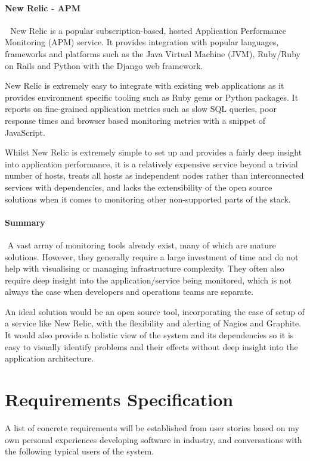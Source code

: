 \documentclass{cshonours}
\begin{document}
\subsubsection{New Relic - APM} 
New Relic is a popular subscription-based, hosted Application Performance Monitoring (APM) service. It provides integration with popular languages, frameworks and platforms such as the Java Virtual Machine (JVM), Ruby/Ruby on Rails and Python with the Django web framework.

New Relic is extremely easy to integrate with existing web applications as it provides environment specific tooling such as Ruby gems or Python packages. It reports on fine-grained application metrics such as slow SQL queries, poor response times and browser based monitoring metrics with a snippet of JavaScript.

Whilst New Relic is extremely simple to set up and provides a fairly deep insight into application performance, it is a relatively expensive service beyond a trivial number of hosts, treats all hosts as independent nodes rather than interconnected services with dependencies, and lacks the extensibility of the open source solutions when it comes to monitoring other non-supported parts of the stack.

\subsubsection{Summary}
 A vast array of monitoring tools already exist, many of which are mature solutions. However, they generally require a large investment of time and do not help with visualising or managing infrastructure complexity. They often also require deep insight into the application/service being monitored, which is not always the case when developers and operations teams are separate.

An ideal solution would be an open source tool, incorporating the ease of setup of a service like New Relic, with the flexibility and alerting of Nagios and Graphite. It would also provide a holistic view of the system and its dependencies so it is easy to visually identify problems and their effects without deep insight into the application architecture.


\chapter{Requirements Specification}

A list of concrete requirements will be established from user stories based on my own personal experiences developing software in industry, and conversations with the following typical users of the system.
\end{document}
